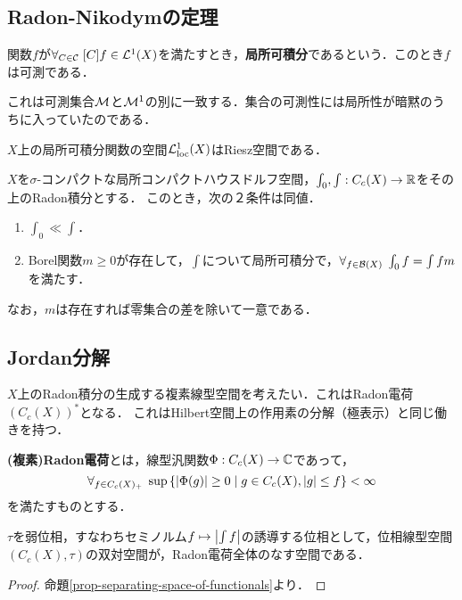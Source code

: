 \documentclass[uplatex,dvipdfmx]{jsreport}
\begin{document}
\subsection{Radon-Nikodymの定理}

\begin{definition}\label{def-locally-integrable-function}
    関数$f$が$\forall_{C\in\mathcal{C}}\;[C]f\in\mathcal{L}^1(X)$を満たすとき，\textbf{局所可積分}であるという．このとき$f$は可測である．
\end{definition}
\begin{remarks}
    これは可測集合$\mathcal{M}$と$\mathcal{M}^1$の別に一致する．集合の可測性には局所性が暗黙のうちに入っていたのである．
\end{remarks}

\begin{lemma}
    $X$上の局所可積分関数の空間$\mathcal{L}^1_{\mathrm{loc}}(X)$はRiesz空間である．
\end{lemma}

\begin{theorem}
    $X$を$\sigma$-コンパクトな局所コンパクトハウスドルフ空間，$\int_0,\int:C_c(X)\to\mathbb{R}$をその上のRadon積分とする．
    このとき，次の２条件は同値．
    \begin{enumerate}
        \item $\int_0\ll\int$．
        \item Borel関数$m\ge0$が存在して，$\int$について局所可積分で，$\forall_{f\in\mathcal{B}(X)}\;\int_0f=\int fm$を満たす．
    \end{enumerate}
    なお，$m$は存在すれば零集合の差を除いて一意である．
\end{theorem}

\subsection{Jordan分解}

\begin{tcolorbox}[colframe=ForestGreen, colback=ForestGreen!10!white,breakable,colbacktitle=ForestGreen!40!white,coltitle=black,fonttitle=\bfseries\sffamily,
title=]
    $X$上のRadon積分の生成する複素線型空間を考えたい．これはRadon電荷$(C_c(X))^*$となる．
    これはHilbert空間上の作用素の分解（極表示）と同じ働きを持つ．
\end{tcolorbox}

\begin{definition}
    \textbf{(複素)Radon電荷}とは，線型汎関数$\Phi:C_c(X)\to\mathbb{C}$であって，
    \[\forall_{f\in C_c(X)_+}\;\sup\left\{\lvert\Phi(g)\rvert\ge0\mid g\in C_c(X),\lvert g\rvert\le f\right\}<\infty\]
    を満たすものとする．
\end{definition}
\begin{lemma}
    $\tau$を弱位相，すなわちセミノルム$f\mapsto\left|\int f\right|$の誘導する位相として，位相線型空間$(C_c(X),\tau)$の双対空間が，Radon電荷全体のなす空間である．
\end{lemma}
\begin{proof}
    命題\ref{prop-separating-space-of-functionals}より．
\end{proof}
\end{document}
